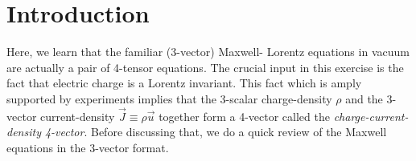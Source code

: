 \newpage



\section{Introduction}
Here, we learn that the familiar (3-vector) Maxwell-   
Lorentz equations in vacuum are actually a pair of    
4-tensor equations. The crucial input in this exercise is 
the fact that {electric charge is a Lorentz invariant}. 
This fact which is amply supported by experiments implies 
that the 3-scalar charge-density $\rho$ and the  3-vector  
current-density $ \vec{J} \equiv \rho\vec{u}$ together form 
a 4-vector called the \textsl{charge-current-density 
4-vector}. Before discussing  that, we do a quick review of 
the Maxwell equations in the 3-vector format.

